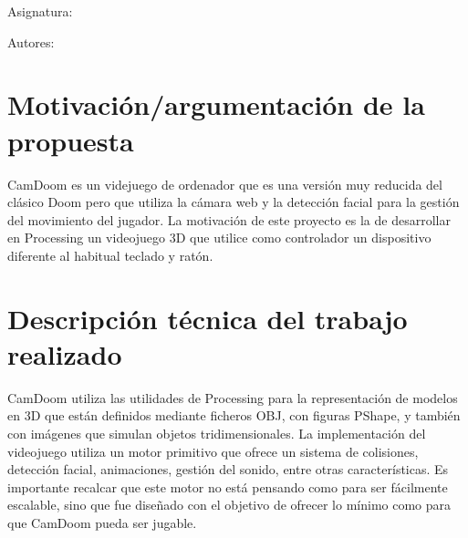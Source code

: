 \documentclass{article}
\begin{document}
\begin{titlepage}
    \begin{center}
        {\bfseries\LARGE \myuniversity \par}
        \vspace{0.5cm}
        {\scshape\Large \mydegree \par}
        \vspace{3cm}
        {\scshape\Huge \mytitle \par}
        \vspace{2cm}
        \vfill
        {\Large Asignatura: \par}
        {\Large \mysubject \par}
        \vspace{2cm}
        {\Large Autores: \par}
        {\Large \myauthorone \par}
        \vspace{0.2cm}
        {\Large \myauthortwo \par}
        \vspace{0.5cm}
        \vspace{1cm}
    \end{center}
\end{titlepage}

\tableofcontents
\newpage

\section{Motivación/argumentación de la propuesta}

CamDoom es un videjuego de ordenador que es una versión muy reducida del clásico Doom
pero que utiliza la cámara web y la detección facial para la gestión del movimiento del
jugador. La motivación de este proyecto es la de desarrollar en Processing un videojuego
3D que utilice como controlador un dispositivo diferente al habitual teclado y ratón.

\section{Descripción técnica del trabajo realizado}

CamDoom utiliza las utilidades de Processing para la representación de modelos en 3D
que están definidos mediante ficheros OBJ, con figuras PShape, y también con imágenes
que simulan objetos tridimensionales. La implementación del videojuego utiliza un motor
primitivo que ofrece un sistema de colisiones, detección facial, animaciones, gestión
del sonido, entre otras características. Es importante recalcar que este motor no está
pensando como para ser fácilmente escalable, sino que fue diseñado con el objetivo de
ofrecer lo mínimo como para que CamDoom pueda ser jugable.
\end{document}
